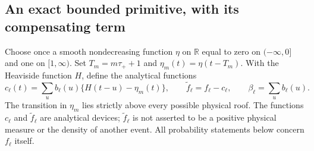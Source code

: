 \subsection{An exact bounded primitive, with its compensating term}

Choose once a smooth nondecreasing function $\eta$ on $\mathbb R$
equal to zero on $(-\infty,0]$ and one on $[1,\infty)$.
Set $T_m=m\tau_++1$ and $\eta_m(t)=\eta(t-T_m)$.
With the Heaviside function $H$, define the analytical functions
\begin{equation}\label{eq:pa-primitive}
 c_\ell(t)=\sum_u b_\ell(u)\{H(t-u)-\eta_m(t)\},
 \qquad \widetilde f_\ell=f_\ell-c_\ell,
 \qquad \beta_\ell=\sum_u b_\ell(u).
\end{equation}
The transition in $\eta_m$ lies strictly above every possible
physical roof. The functions $c_\ell$ and $\widetilde f_\ell$
are analytical devices; $\widetilde f_\ell$ is not asserted to
be a positive physical measure or the density of another event.
All probability statements below concern $f_\ell$ itself.

